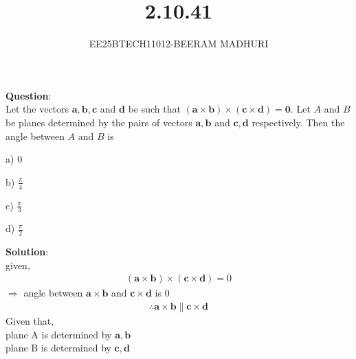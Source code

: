 \documentclass[journal]{IEEEtran}
\begin{document}

\vspace{3cm}

\title{2.10.41}
\author{EE25BTECH11012-BEERAM MADHURI}
{\let\newpage\relax\maketitle}

\renewcommand{\thefigure}{\theenumi}
\renewcommand{\thetable}{\theenumi}
\setlength{\intextsep}{10pt} %


\renewcommand{\thetable}{\theenumi}


\textbf{Question}:\\
Let the vectors $\mathbf{a}, \mathbf{b}, \mathbf{c}$ and $\mathbf{d}$ be such that $(\mathbf{a} \times \mathbf{b}) \times (\mathbf{c} \times \mathbf{d}) = \mathbf{0}$. Let $A$ and $B$ be planes determined by the pairs of vectors $\mathbf{a}, \mathbf{b}$ and $\mathbf{c}, \mathbf{d}$ respectively. Then the angle between $A$ and $B$ is

\begin{enumerate}
\begin{multicols}{4}
\item[a)] $0$
\item[b)] $\frac{\pi}{4}$
\item[c)] $\frac{\pi}{3}$
\item[d)] $\frac{\pi}{2}$
\end{multicols}
\end{enumerate}
\textbf{Solution}:\\
given, 
\begin{align}
(\mathbf{a} \times \mathbf{b}) \times (\mathbf{c} \times \mathbf{d}) = 0
\end{align}
$\Rightarrow$ angle between $\mathbf{a} \times \mathbf{b}$ and $\mathbf{c} \times \mathbf{d}$ is $0$
\begin{align}
\therefore \mathbf{a} \times \mathbf{b} \parallel \mathbf{c} \times \mathbf{d}
\end{align}
Given that,\\
plane A is determined by $\mathbf{a}, \mathbf{b}$\\
plane B is determined by $\mathbf{c}, \mathbf{d}$\\
\end{document}
